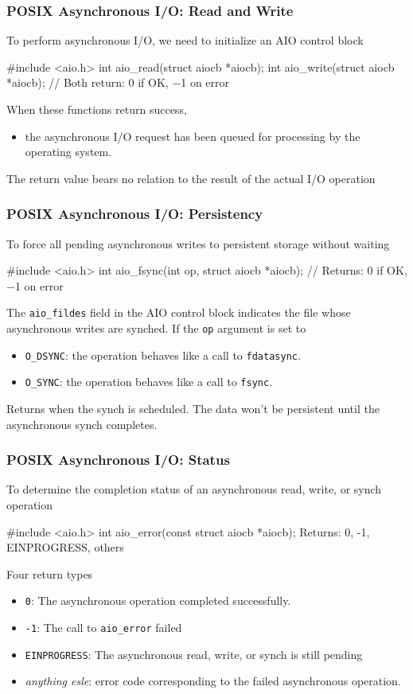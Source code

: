 \documentclass[newPxFont,sthlmFooter,nooffset]{beamer}
\begin{document}
\begin{frame}[t, fragile]
  \frametitle{POSIX Asynchronous I/O: Read and Write}
To perform asynchronous I/O, we need to initialize an AIO control block
\begin{codedef}
#include <aio.h>
int aio_read(struct aiocb *aiocb); int aio_write(struct aiocb *aiocb);
// Both return: 0 if OK, −1 on error
\end{codedef}
\bigskip
When these functions return success,
\begin{itemize}
\item the asynchronous I/O request has been queued for processing by
  the operating system.
\end{itemize}
\bigskip

The return value bears no relation to the result of the actual I/O operation
\end{frame}


\begin{frame}[t, fragile]
  \frametitle{POSIX Asynchronous I/O: Persistency}
To force all pending asynchronous writes to persistent storage without waiting
\begin{codedef}
#include <aio.h>
int aio_fsync(int op, struct aiocb *aiocb);
// Returns: 0 if OK, −1 on error
\end{codedef}
The \texttt{aio\_fildes} field in the AIO control block indicates the file whose asynchronous writes are synched.
\bigskip
If the \texttt{op} argument is set to
\begin{itemize}
\item \texttt{O\_DSYNC}: the operation behaves like a call to
  \texttt{fdatasync}.
\item \texttt{O\_SYNC}: the operation behaves like a call to \texttt{fsync}.
\end{itemize}

Returns when the synch is scheduled. The data won’t be persistent until the asynchronous synch completes.
\end{frame}

\begin{frame}[t, fragile]
  \frametitle{POSIX Asynchronous I/O: Status}
To determine the completion status of an asynchronous read, write, or synch operation

\begin{codedef}
#include <aio.h>
int aio_error(const struct aiocb *aiocb);
Returns: 0, -1, EINPROGRESS, others
\end{codedef}

Four return types
\begin{itemize}
\item \texttt{0}: The asynchronous operation completed successfully.
\item \texttt{-1}: The call to \texttt{aio\_error} failed
\item \texttt{EINPROGRESS}: The asynchronous read, write, or synch is still pending
\item \textit{anything esle}: error code corresponding to the failed asynchronous operation.
\end{itemize}
\end{frame}
\end{document}
